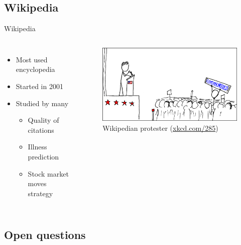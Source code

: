 \documentclass{beamer}
\begin{document}
\subsection{Wikipedia}
\begin{frame}[c]{Wikipedia}
    \begin{columns}
        \begin{itemize}
            \item Most used encyclopedia
            \item Started in 2001
            \item Studied by many
            \begin{itemize}
                \item Quality of citations~\cite{Nielsen2007}
                \item Illness prediction~\cite{McIver2014}
                \item Stock market moves strategy~\cite{Moat2013}
            \end{itemize}
        \end{itemize}
        \begin{figure}
        \centering
        \includegraphics[width=\textwidth]{assets/wikipedian_protester}
        \caption{\centering Wikipedian protester (\url{xkcd.com/285})}
        \end{figure}
    \end{columns}
\end{frame}

\subsection{Open questions}
\end{document}

